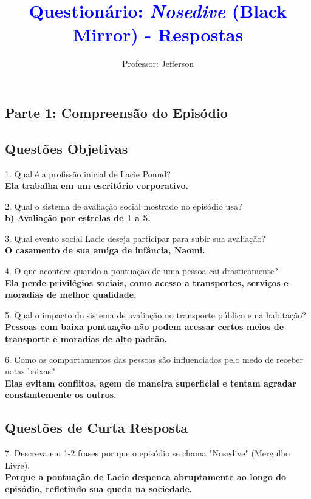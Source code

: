 \documentclass[11pt]{article}
\title{\textcolor{blue}{Question\'ario: \textit{Nosedive} (Black Mirror) - Respostas}}
\author{Professor: Jefferson}
\date{}
\begin{document}
\maketitle
\vspace{-1cm}

\begin{multicols}{2}

\section*{Parte 1: Compreens\~ao do Epis\'odio}

\subsection*{Quest\~oes Objetivas}

1. Qual \'e a profiss\~ao inicial de Lacie Pound?\\
\textbf{Ela trabalha em um escritório corporativo.}

2. Qual o sistema de avaliação social mostrado no episódio usa?\\
\textbf{b) Avaliação por estrelas de 1 a 5.}

3. Qual evento social Lacie deseja participar para subir sua avaliação?\\
\textbf{O casamento de sua amiga de infância, Naomi.}

4. O que acontece quando a pontuação de uma pessoa cai drasticamente?\\
\textbf{Ela perde privilégios sociais, como acesso a transportes, serviços e moradias de melhor qualidade.}

5. Qual o impacto do sistema de avaliação no transporte público e na habitação?\\
\textbf{Pessoas com baixa pontuação não podem acessar certos meios de transporte e moradias de alto padrão.}

6. Como os comportamentos das pessoas são influenciados pelo medo de receber notas baixas?\\
\textbf{Elas evitam conflitos, agem de maneira superficial e tentam agradar constantemente os outros.}

\subsection*{Quest\~oes de Curta Resposta}

7. Descreva em 1-2 frases por que o episódio se chama "Nosedive" (Mergulho Livre).\\
\textbf{Porque a pontuação de Lacie despenca abruptamente ao longo do episódio, refletindo sua queda na sociedade.}


\end{multicols}
\end{document}
